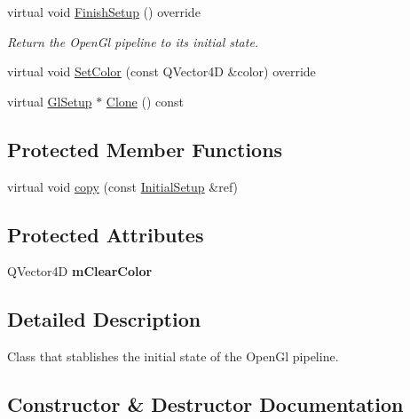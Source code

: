 \begin{DoxyCompactItemize}
virtual void \mbox{\hyperlink{class_geometry_engine_1_1_geometry_gl_setup_1_1_initial_setup_a4ba4e34bcc09a800ab98dbe3181f1263}{Finish\+Setup}} () override
\begin{DoxyCompactList}\small\item\em Return the Open\+Gl pipeline to its initial state. \end{DoxyCompactList}\item 
virtual void \mbox{\hyperlink{class_geometry_engine_1_1_geometry_gl_setup_1_1_initial_setup_a403192af4493ada23671bf1d95f2da89}{Set\+Color}} (const Q\+Vector4D \&color) override
\item 
virtual \mbox{\hyperlink{class_geometry_engine_1_1_geometry_gl_setup_1_1_gl_setup}{Gl\+Setup}} $\ast$ \mbox{\hyperlink{class_geometry_engine_1_1_geometry_gl_setup_1_1_initial_setup_ade45cd909edd6ff3cae7323d5e1c53d0}{Clone}} () const
\end{DoxyCompactItemize}
\subsection*{Protected Member Functions}
\begin{DoxyCompactItemize}
\item 
virtual void \mbox{\hyperlink{class_geometry_engine_1_1_geometry_gl_setup_1_1_initial_setup_a2140bf33e9792369fc60853c58fdc789}{copy}} (const \mbox{\hyperlink{class_geometry_engine_1_1_geometry_gl_setup_1_1_initial_setup}{Initial\+Setup}} \&ref)
\end{DoxyCompactItemize}
\subsection*{Protected Attributes}
\begin{DoxyCompactItemize}
\item 
\mbox{\label{class_geometry_engine_1_1_geometry_gl_setup_1_1_initial_setup_a57a43dd347299730694682cc4d747109}} 
Q\+Vector4D {\bfseries m\+Clear\+Color}
\end{DoxyCompactItemize}


\subsection{Detailed Description}
Class that stablishes the initial state of the Open\+Gl pipeline. 

\subsection{Constructor \& Destructor Documentation}
\mbox{\label{class_geometry_engine_1_1_geometry_gl_setup_1_1_initial_setup_ad6ddb23c7317917d38d9f2510394ee11}} 
